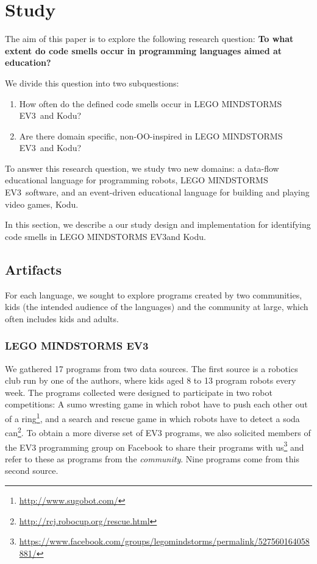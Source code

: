 \documentclass[conference]{IEEEtran}
\newcommand{\ms}{LEGO MINDSTORMS EV3}
\begin{document}
\section{Study}
\label{sec:study}
The aim of this paper is to explore the following research question: \textbf{To what extent do code smells occur in programming languages aimed at education?} 

We divide this question into two subquestions:

\begin{enumerate}
\item{How often do the defined code smells occur in \ms~and Kodu?}
\item{Are there domain specific, non-OO-inspired in \ms~and Kodu?}
\end{enumerate}
To answer this research question, we study two new domains: a data-flow educational language for programming robots, \ms~software,  and an event-driven educational language for building and playing video games, Kodu. 



In this section, we describe a our study design and implementation for identifying code smells in \ms and Kodu.

\subsection{Artifacts}
For each language, we sought to explore programs created by two communities, kids (the intended audience of the languages) and the community at large, which often includes kids and adults. 

\subsubsection{\ms}
We  gathered 17 programs from two data sources. The first source is a robotics club run by one of the authors, where kids aged 8 to 13 program robots every week. The programs collected were designed to participate in two robot competitions: A sumo wresting game in which robot have to push each other out of a ring\footnote{\url{http://www.sugobot.com/}}, and a search and rescue game in which robots have to detect a soda can\footnote{\url{http://rcj.robocup.org/rescue.html}}. To obtain a more diverse set of EV3 programs, we also solicited members of the EV3 programming group on Facebook to share their programs with us\footnote{\url{https://www.facebook.com/groups/legomindstorms/permalink/527560164058881/}} and refer to these as programs from the \emph{community}. Nine programs come from this second source. 
\end{document}
